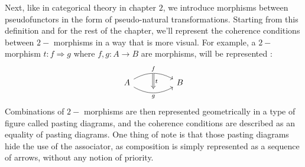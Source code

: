 \documentclass[a4paper, 12pt, twoside,openright]{report}
\begin{document}
Next, like in categorical theory in chapter $2$, we introduce morphisms between pseudofunctors in the form of pseudo-natural transformations.
Starting from this definition and for the rest of the chapter, we'll represent the coherence conditions between $2-$ morphisms in a way that is more visual. For example, a $2-$morphism $t:f\Rightarrow g$ where $f,g:A\rightarrow B$ are morphisms, will be represented : 
$$\begin{tikzcd}
A
\arrow[bend left]{rr}{f} [name=U]{}
\arrow[bend right]{rr}[swap]{g}[name=D]{}
 &&
B
  \arrow[Rightarrow,from=U, to=D,"t"]
\end{tikzcd}$$ 
Combinations of $2-$ morphisms are then represented geometrically in a type of figure called pasting diagrams, and the coherence conditions are described as an equality of pasting diagrams. One thing of note is that those pasting diagrams hide the use of the associator, as composition is simply represented as a sequence of arrows, without any notion of priority. \\
\end{document}
